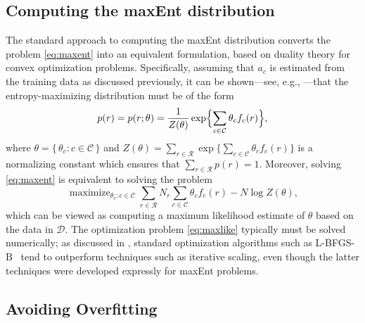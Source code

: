 \documentclass[11pt]{article}
\DeclareMathOperator*{\maximize}{maximize}
\newcommand{\xC}{\mathcal{C}}
\newcommand{\xD}{\mathcal{D}}
\newcommand{\xR}{\mathcal{R}}
\begin{document}
\subsection{Computing the maxEnt distribution}

The standard approach to computing the maxEnt distribution converts the problem \eqref{eq:maxent} into an equivalent formulation, based on duality theory for convex optimization problems. Specifically, assuming that $a_c$ is estimated from the training data as discussed previously, it can be shown---see, e.g., \cite{PietraPL97}---that the entropy-maximizing distribution must be of the form
\begin{equation}\label{eq:expmodel}
p(r)=p(r;\theta)=\frac{1}{Z(\theta)}\exp\Bigl\{\sum_{c\in\xC}\theta_c f_c(r)\Bigr\},
\end{equation}
where $\theta=\{\,\theta_c:c\in\xC\,\}$ and $Z(\theta)=\sum_{r\in\xR}\exp\bigl\{\sum_{c\in\xC}\theta_c f_c(r)\bigr\}$ is a normalizing constant which ensures that $\sum_{r\in\xR}p(r)=1$. Moreover, solving \eqref{eq:maxent} is equivalent to solving the problem 
\begin{equation}\label{eq:maxlike}
\maximize_{\theta_c:c\in\xC}\sum_{r\in\xR}N_r\sum_{c\in\xC}\theta_cf_c(r)-N\log Z(\theta),
\end{equation}
which can be viewed as computing a maximum likelihood estimate of $\theta$ based on the data in $\xD$. The optimization problem  \eqref{eq:maxlike} typically must be solved numerically; as discussed in \cite{Malouf02}, standard optimization algorithms such as L-BFGS-B~\cite{ZhuBLN97} tend to outperform techniques such as iterative scaling, even though the latter techniques were developed expressly for maxEnt problems.

\subsection{Avoiding Overfitting}
\end{document}
